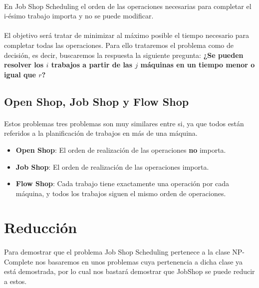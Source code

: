 \documentclass[11pt, a4paper,spanish]{article}
\begin{document}
				\paragraph{}
				En Job Shop Scheduling el orden de las operaciones necesarias para completar el i-ésimo trabajo importa y no se puede modificar.
			 
				\paragraph{}
				El objetivo será tratar de minimizar al máximo posible el tiempo necesario para completar todas las operaciones. Para ello trataremos el problema como de decisión, es decir, buscaremos la respuesta la siguiente pregunta:  
				\newline
				{ \bf ¿Se pueden resolver los $i$ trabajos a partir de las $j$ máquinas en un tiempo menor o igual que $r$?}
				
			\subsection{Open Shop, Job Shop y Flow Shop}
			
				\paragraph{}
				Estos problemas tres problemas son muy similares entre si, ya que todos están referidos a la planificación de trabajos en más de una máquina.
				
				\begin{itemize}
				
					\item {\bf Open Shop}: El orden de realización de las operaciones {\bf no} importa.
					
					\item {\bf Job Shop}: El orden de realización de las operaciones importa.
					
					\item {\bf Flow Shop}: Cada trabajo tiene exactamente una operación por cada máquina, y todos los trabajos siguen el mismo orden de operaciones.
					
				\end{itemize}
			
		\section{Reducción}
		
			\paragraph{}
			Para demostrar que el problema Job Shop Scheduling pertenece a la clase NP-Complete nos basaremos en unos problemas cuya pertenencia a dicha clase ya está demostrada, por lo cual nos bastará demostrar que JobShop se puede reducir a estos. 
			
\end{document}
